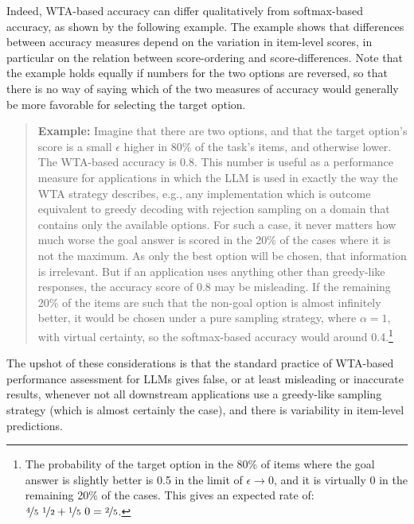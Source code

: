 \documentclass[fleqn]{article}
\begin{document}
Indeed, WTA-based accuracy can differ qualitatively from softmax-based accuracy, as shown by the following example.
The example shows that differences between accuracy measures depend on the variation in item-level scores, in particular on the relation between score-ordering and score-differences.
Note that the example holds equally if numbers for the two options are reversed, so that there is no way of saying which of the two measures of accuracy would generally be more favorable for selecting the target option.
%
\begin{quote}
  \textbf{Example:}
  Imagine that there are two options, and that the target option's score is a small $\epsilon$ higher in 80\% of the task's items, and otherwise lower.
  The WTA-based accuracy is 0.8.
  This number is useful as a performance measure for applications in which the LLM is used in exactly the way the WTA strategy describes, e.g., any implementation which is outcome equivalent to greedy decoding with rejection sampling on a domain that contains only the available options.
  For such a case, it never matters how much worse the goal answer is scored in the 20\% of the cases where it is not the maximum.
  As only the best option will be chosen, that information is irrelevant.
  But if an application uses anything other than greedy-like responses, the accuracy score of 0.8 may be misleading.
  If the remaining 20\% of the items are such that the non-goal option is almost infinitely better, it would be chosen under a pure sampling strategy, where $\alpha = 1$, with virtual certainty, so the softmax-based accuracy would around 0.4.\footnote{The probability of the target option in the 80\% of items where the goal answer is slightly better is 0.5 in the limit of $\epsilon \rightarrow 0$, and it is virtually 0 in the remaining 20\% of the cases. This gives an expected rate of: $\nicefrac{4}{5} \ \nicefrac{1}{2} + \nicefrac{1}{5} \ 0 = \nicefrac{2}{5}$.}
\end{quote}
%
The upshot of these considerations is that the standard practice of WTA-based performance assessment for LLMs gives false, or at least misleading or inaccurate results, whenever not all downstream applications use a greedy-like sampling strategy (which is almost certainly the case), and there is variability in item-level predictions.



\end{document}
